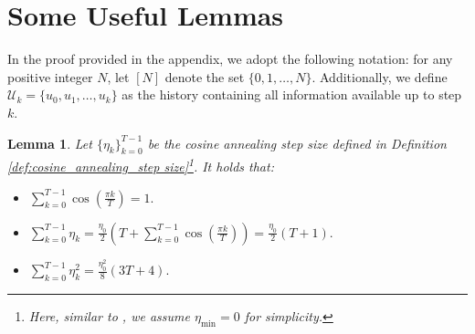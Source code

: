 \documentclass{article}
\theoremstyle{plain}
\newtheorem{lemma}[theorem]{Lemma}
\theoremstyle{definition}
\theoremstyle{remark}
\begin{document}
\section{Some Useful Lemmas}
In the proof provided in the appendix, we adopt the following notation: for any positive integer $N$, let $[N]$ denote the set $\{0, 1, \ldots, N\}$. Additionally, we define $\mathcal{U}_k = \{u_0, u_1, \ldots, u_k\}$ as the history containing all information available up to step $k$.


\begin{lemma}\label{lem:cosine_annealing_step sizes}
Let $\{\eta_k\}_{k=0}^{T-1}$ be the cosine annealing step size defined in Definition \ref{def:cosine_annealing_step size}\footnote{Here, similar to \cite{li2021secondlookexponentialcosine}, we assume $\eta_{\min}=0$ for simplicity.}. It holds that:
\begin{itemize}[leftmargin=*]
  \item %
  $\displaystyle \sum_{k=0}^{T-1} \cos\left(\frac{\pi k}{T}\right) = 1.$
  \item %
  $\displaystyle \sum_{k=0}^{T-1} \eta_k
      = \frac{\eta_0}{2}\left( T + \sum_{k=0}^{T-1}\cos\left(\frac{\pi k}{T}\right) \right)
      = \frac{\eta_0}{2}(T+1).$
  \item %
  $\displaystyle \sum_{k=0}^{T-1} \eta_k^{2}
      = \frac{\eta_0^{2}}{8}(3T+4).$
\end{itemize}
\end{lemma}
\end{document}
